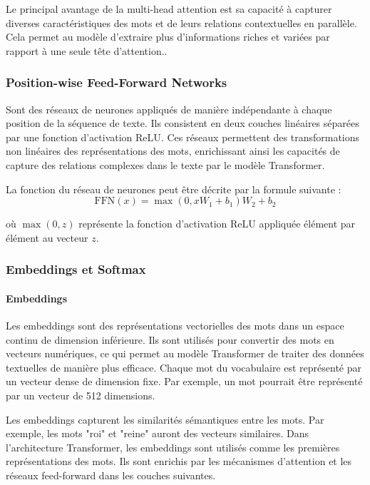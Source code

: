 Le principal avantage de la multi-head attention est sa capacité à capturer diverses caractéristiques des mots et de leurs relations contextuelles en parallèle. Cela permet au modèle d'extraire plus d'informations riches et variées par rapport à une seule tête d'attention..

\subsubsection{Position-wise Feed-Forward Networks}

Sont des réseaux de neurones appliqués de manière indépendante à chaque position de la séquence de texte. Ils consistent en deux couches linéaires séparées par une fonction d'activation ReLU. Ces réseaux permettent des transformations non linéaires des représentations des mots, enrichissant ainsi les capacités de capture des relations complexes dans le texte par le modèle Transformer.

La fonction du réseau de neurones peut être décrite par la formule suivante : 
\begin{equation}
    \text{FFN}(x) = \max(0, xW_1 + b_1)W_2 + b_2
\end{equation}

où \( \max(0, z) \) représente la fonction d'activation ReLU appliquée élément par élément au vecteur \( z \).

\subsubsection{Embeddings et Softmax}
\label{ch:1:section:embeddings}

\paragraph{Embeddings} \hspace{0pt}

Les embeddings sont des représentations vectorielles des mots dans un espace continu de dimension inférieure. Ils sont utilisés pour convertir des mots en vecteurs numériques, ce qui permet au modèle Transformer de traiter des données textuelles de manière plus efficace. Chaque mot du vocabulaire est représenté par un vecteur dense de dimension fixe. Par exemple, un mot pourrait être représenté par un vecteur de 512 dimensions.

Les embeddings capturent les similarités sémantiques entre les mots. Par exemple, les mots "roi" et "reine" auront des vecteurs similaires. Dans l'architecture Transformer, les embeddings sont utilisés comme les premières représentations des mots. Ils sont enrichis par les mécanismes d'attention et les réseaux feed-forward dans les couches suivantes.

